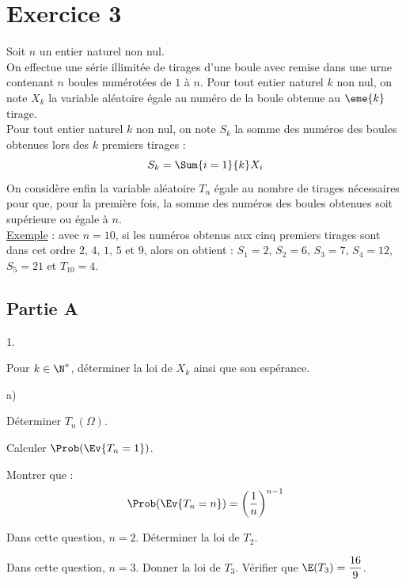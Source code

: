 
\section*{Exercice 3}
\noindent
Soit $n$ un entier naturel non nul.\\
On effectue une série illimitée de tirages d'une boule avec remise
dans une urne contenant $n$ boules numérotées de $1$ à $n$. Pour tout
entier naturel $k$ non nul, on note $X_k$ la variable aléatoire égale
au numéro de la boule obtenue au $\eme{k}$ tirage.\\
Pour tout entier naturel $k$ non nul, on note $S_k$ la somme des
numéros des boules obtenues lors des $k$ premiers tirages :
\[
S_k = \Sum{i=1}{k} X_i
\]
On considère enfin la variable aléatoire $T_n$ égale au nombre de
tirages nécessaires pour que, pour la première fois, la somme des
numéros des boules obtenues soit supérieure ou égale à $n$.\\[.2cm]
\underline{Exemple} : avec $n=10$, si les numéros obtenus aux cinq
premiers tirages sont dans cet ordre $2$, $4$, $1$, $5$ et $9$, alors
on obtient : $S_1=2$, $S_2=6$, $S_3=7$, $S_4=12$, $S_5=21$ et
$T_{10}=4$.

\subsection*{Partie A}

\begin{noliste}{1.}
\item Pour $k\in\N^*$, déterminer la loi de $X_k$ ainsi que son espérance.
  
  
  

\item \begin{noliste}{a)}
  \item Déterminer $T_n(\Omega)$.
    
    
    
  \item Calculer $\Prob(\Ev{T_n=1})$.
    
    
    
  \item Montrer que :
    \[
    \Prob(\Ev{T_n=n}) = \left(\frac{1}{n}\right)^{n-1}
    \]
    
    
  \end{noliste}



  
\item Dans cette question, $n=2$. Déterminer la loi de $T_2$.
  
  

\item Dans cette question, $n=3$. Donner la loi de $T_3$. Vérifier que
  $\E(T_3)=\dfrac{16}{9}$.
  
  
\end{noliste}


